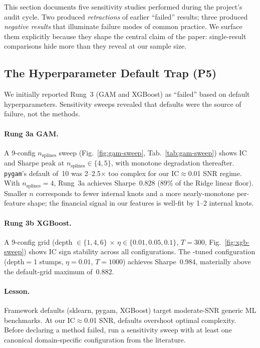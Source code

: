 \documentclass[11pt]{article}
\begin{document}
This section documents five sensitivity studies performed during the
project's audit cycle. Two produced \emph{retractions} of earlier
``failed'' results; three produced \emph{negative results} that
illuminate failure modes of common practice. We surface them
explicitly because they shape the central claim of the paper:
single-result comparisons hide more than they reveal at our sample size.

\subsection{The Hyperparameter Default Trap (P5)}\label{subsec:default-trap}

We initially reported Rung~3 (GAM and XGBoost) as ``failed'' based on
default hyperparameters. Sensitivity sweeps revealed that defaults were
the source of failure, not the methods.

\paragraph{Rung 3a GAM.}
A 9-config $n_{\text{splines}}$ sweep (Fig.~\ref{fig:gam-sweep},
Tab.~\ref{tab:gam-sweep}) shows IC and Sharpe peak at
$n_{\text{splines}}\in\{4,5\}$, with monotone degradation thereafter.
\texttt{pygam}'s default of~10 was 2--2.5$\times$ too complex for our
IC$\approx$0.01 SNR regime. With $n_{\text{splines}}{=}4$, Rung~3a
achieves Sharpe~0.828 (89\% of the Ridge linear floor). Smaller $n$
corresponds to fewer internal knots and a more nearly-monotone
per-feature shape; the financial signal in our features is well-fit by
1--2 internal knots.

\paragraph{Rung 3b XGBoost.}
A 9-config grid (depth $\in \{1,4,6\}$ $\times$ $\eta \in \{0.01,
0.05, 0.1\}$, $T{=}300$, Fig.~\ref{fig:xgb-sweep}) shows IC sign
stability across all configurations. The \citet{gu_kelly_xiu}-tuned
configuration (depth$=$1 stumps, $\eta=0.01$, $T{=}1000$) achieves
Sharpe~0.984, materially above the default-grid maximum of~0.882.

\paragraph{Lesson.}
Framework defaults (sklearn, pygam, XGBoost) target moderate-SNR
generic ML benchmarks. At our IC$\approx$0.01 SNR, defaults overshoot
optimal complexity. Before declaring a method failed, run a sensitivity
sweep with at least one canonical domain-specific configuration from
the literature.
\end{document}
